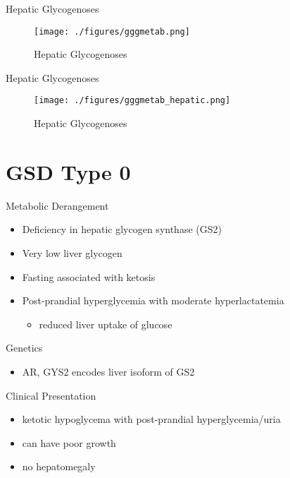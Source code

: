 \documentclass[presentation, smaller]{beamer}
\begin{document}
\begin{frame}[label={sec:orge2b6ed7}]{Hepatic Glycogenoses}
\begin{figure}[htbp]
\centering
\texttt{[image: ./figures/gggmetab.png]}
\caption[Hepatic Glycogenoses]{\label{fig:orgcce7768}
Hepatic Glycogenoses}
\end{figure}
\end{frame}



\begin{frame}[label={sec:orge2f6025}]{Hepatic Glycogenoses}
\begin{figure}[htbp]
\centering
\texttt{[image: ./figures/gggmetab\_hepatic.png]}
\caption[Hepatic Glycogenoses]{\label{fig:org8b532e0}
Hepatic Glycogenoses}
\end{figure}
\end{frame}


\section{GSD Type 0}
\label{sec:orgf5f2ef6}
\begin{frame}[label={sec:orgaba8d3c}]{Metabolic Derangement}
\begin{itemize}
\item Deficiency in hepatic glycogen synthase (GS2)
\item Very low liver glycogen
\item Fasting associated with ketosis
\item Post-prandial hyperglycemia with moderate hyperlactatemia
\begin{itemize}
\item reduced liver uptake of glucose
\end{itemize}
\end{itemize}
\end{frame}

\begin{frame}[label={sec:org9780b90}]{Genetics}
\begin{itemize}
\item AR, GYS2 encodes liver isoform of GS2
\end{itemize}
\end{frame}

\begin{frame}[label={sec:org4f4b3d6}]{Clinical Presentation}
\begin{itemize}
\item ketotic hypoglycema with post-prandial hyperglycemia/uria
\item can have poor growth
\item no hepatomegaly
\end{itemize}
\end{frame}
\end{document}
